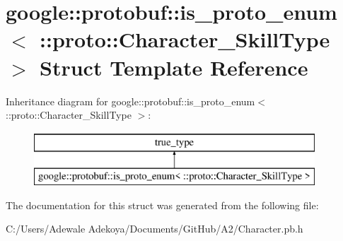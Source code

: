 \hypertarget{structgoogle_1_1protobuf_1_1is__proto__enum_3_01_1_1proto_1_1_character___skill_type_01_4}{}\section{google\+:\+:protobuf\+:\+:is\+\_\+proto\+\_\+enum$<$ \+:\+:proto\+:\+:Character\+\_\+\+Skill\+Type $>$ Struct Template Reference}
\label{structgoogle_1_1protobuf_1_1is__proto__enum_3_01_1_1proto_1_1_character___skill_type_01_4}
Inheritance diagram for google\+:\+:protobuf\+:\+:is\+\_\+proto\+\_\+enum$<$ \+:\+:proto\+:\+:Character\+\_\+\+Skill\+Type $>$\+:\begin{figure}[H]
\begin{center}
\leavevmode
\includegraphics[height=2.000000cm]{structgoogle_1_1protobuf_1_1is__proto__enum_3_01_1_1proto_1_1_character___skill_type_01_4}
\end{center}
\end{figure}


The documentation for this struct was generated from the following file\+:\begin{DoxyCompactItemize}
\item 
C\+:/\+Users/\+Adewale Adekoya/\+Documents/\+Git\+Hub/\+A2/Character.\+pb.\+h\end{DoxyCompactItemize}
